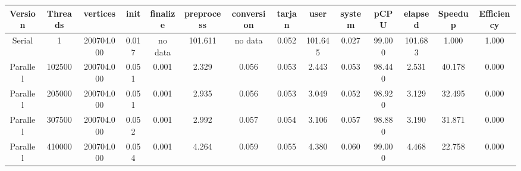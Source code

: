 \begin{tabular}{|c|c|c|c|c|c|c|c|c|c|c|c|c|c|}
\toprule
 Version &  Threads &   vertices &  init & finalize &  preprocess & conversion &  tarjan &    user &  system &   pCPU &  elapsed &  Speedup &  Efficiency \\
\midrule
  Serial &        1 & 200704.000 & 0.017 &  no data &     101.611 &    no data &   0.052 & 101.645 &   0.027 & 99.000 &  101.683 &    1.000 &       1.000 \\
Parallel &   102500 & 200704.000 & 0.051 &    0.001 &       2.329 &      0.056 &   0.053 &   2.443 &   0.053 & 98.440 &    2.531 &   40.178 &       0.000 \\
Parallel &   205000 & 200704.000 & 0.051 &    0.001 &       2.935 &      0.056 &   0.053 &   3.049 &   0.052 & 98.920 &    3.129 &   32.495 &       0.000 \\
Parallel &   307500 & 200704.000 & 0.052 &    0.001 &       2.992 &      0.057 &   0.054 &   3.106 &   0.057 & 98.880 &    3.190 &   31.871 &       0.000 \\
Parallel &   410000 & 200704.000 & 0.054 &    0.001 &       4.264 &      0.059 &   0.055 &   4.380 &   0.060 & 99.000 &    4.468 &   22.758 &       0.000 \\
\bottomrule
\end{tabular}
